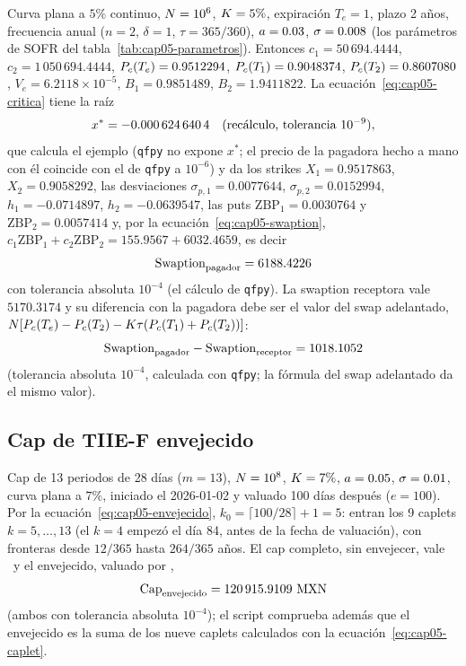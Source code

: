 Curva plana a $5\%$ continuo, $\Nom=10^{6}$, $\K=5\%$, expiración $T_e=1$, plazo 2 años, frecuencia anual
($n=2$, $\delta=1$, $\tau=365/360$), $\hwa=0.03$, $\hwsig=0.008$ (los parámetros de SOFR del
tabla~\ref{tab:cap05-parametros}). Entonces $c_1=50\,694.4444$, $c_2=1\,050\,694.4444$,
$\DF{c}{T_e}=0.9512294$, $\DF{c}{T_1}=0.9048374$, $\DF{c}{T_2}=0.8607080$, $V_e=6.2118\times10^{-5}$,
$B_1=0.9851489$, $B_2=1.9411822$. La ecuación~\eqref{eq:cap05-critica} tiene la raíz
\[
  x^* = \verif{cap05-swaption-x}{-0.0006246404}\quad(\text{recálculo, tolerancia }10^{-9}),
\]
que calcula el ejemplo (\texttt{qfpy} no expone $x^*$; el precio de la pagadora hecho a mano con él coincide con el de
\texttt{qfpy} a $10^{-6}$) y da los strikes $X_1=0.9517863$, $X_2=0.9058292$, las desviaciones $\sigma_{p,1}=0.0077644$,
$\sigma_{p,2}=0.0152994$, $h_1=-0.0714897$, $h_2=-0.0639547$, las puts $\mathrm{ZBP}_1=0.0030764$ y
$\mathrm{ZBP}_2=0.0057414$ y, por la ecuación~\eqref{eq:cap05-swaption},
$c_1\mathrm{ZBP}_1+c_2\mathrm{ZBP}_2=155.9567+6032.4659$, es decir
\[
  \mathrm{Swaption}_{\text{pagador}}=\verif{cap05-swaption-pagador}{6188.4226}
\]
con tolerancia absoluta $10^{-4}$ (el cálculo de \texttt{qfpy}). La swaption receptora vale $5170.3174$ y su
diferencia con la pagadora debe ser el valor del swap adelantado,
$\Nom[\DF{c}{T_e}-\DF{c}{T_2}-\K\tau(\DF{c}{T_1}+\DF{c}{T_2})]$:
\[
  \mathrm{Swaption}_{\text{pagador}}-\mathrm{Swaption}_{\text{receptor}}=\verif{cap05-swaption-paridad}{1018.1052}
\]
(tolerancia absoluta $10^{-4}$, calculada con \texttt{qfpy}; la fórmula del swap adelantado da el mismo valor).

\subsection{Cap de TIIE-F envejecido}

Cap de 13 periodos de 28 días ($m=13$), $\Nom=10^{8}$, $\K=7\%$, $\hwa=0.05$, $\hwsig=0.01$, curva plana a $7\%$,
iniciado el 2026-01-02 y valuado 100 días después ($e=100$). Por la ecuación~\eqref{eq:cap05-envejecido},
$k_0=\lceil100/28\rceil+1=5$: entran los 9 caplets $k=5,\dots,13$ (el $k=4$ empezó el día 84, antes de la
fecha de valuación), con fronteras desde $12/365$ hasta $264/365$ años. El cap completo, sin envejecer, vale
 \MXN\ y el envejecido, valuado por
,
\[
  \mathrm{Cap}_{\text{envejecido}}=\verif{cap05-cap-envejecido}{120915.9109}\ \MXN
\]
(ambos con tolerancia absoluta $10^{-4}$); el script comprueba además que el envejecido es la suma de los
nueve caplets calculados con la ecuación~\eqref{eq:cap05-caplet}.

